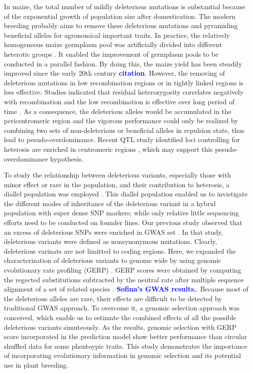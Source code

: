 \documentclass[10pt]{article}
\newcommand{\yang}[1]{\textcolor{blue}{\bf #1}}
\begin{document}
In maize, the total number of mildly deleterious mutations is substantial because of the exponential growth of population size after domestication. The modern breeding probably aims to remove these deleterious mutations and pyramiding beneficial alleles for agronomical important traits. In practice, the relatively homogeneous maize germplasm pool was artificially divided into different heterotic groups \citep{Heerwaarden2012}. It enabled the improvement of germplasm pools to be conducted in a parallel fashion. By doing this, the maize yield has been steadily improved since the early 20th century \yang{citation}. However, the removing of deleterious mutations in low recombination regions or in tightly linked regions is less effective. Studies indicated that residual heterozygosity correlates negatively with recombination \citep{Gore2009, McMullen2009} and the low recombination is effective over long period of time \citep{Haddrill2007}. As a consequence, the deleterious alleles would be accumulated in the pericentromeric region and the vigorous performance could only be realized by combining two sets of non-deleterious or beneficial alleles in repulsion state, thus lead to pesudo-overdominance. Recent QTL study identified loci controlling for heterosis are enriched in centromeric regions \citep{Lariepe2012}, which may support this pesudo-overdominance hypothesis.

To study the relationship between deleterious variants, especially those with minor effect or rare in the population, and their contribution to heterosis, a diallel population was employed \citep{}. This diallel population enabled us to invistigate the different modes of inheritance of the deleterious variant in a hybrid population with super dense SNP markers; while only relative little sequencing efforts need to be conducted on founder lines. Our previous study observed that an excess of deleterious SNPs were enriched in GWAS set \citep{Mezmouk2014}. In that study, deleterious variants were defined as nonsynonymous mutations. Clearly, deleterious varinats are not limitted to coding regions. Here, we expanded the characterization of deleterious variants to genome wide by using genomic evolutionary rate profiling (GERP) \citep{Cooper2005}. GERP scores were obtained by computing the regected substitutions subtracted by the neutral rate after multiple sequence alignment of a set of related species \citep{Davydov2010}. \yang{Sofina's GWAS results.}. Because most of the deleterious alleles are rare, their effects are difficult to be detected by traditional GWAS approach. To overcome it, a genomic selection approach was conceived, which enable us to estimate the combined effects of all the possible deleterious variants simuteously. As the results, genomic selection with GERP score incorporated in the prediction model show better performance than circular shuffled data for some phentoypic traits. This study demonstrates the importance of incorporating evolutionary information in genomic selection and its potential use in plant breeding.
   
\end{document}
